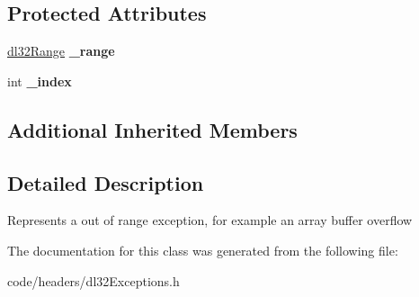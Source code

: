 \subsection*{Protected Attributes}
\begin{DoxyCompactItemize}
\item 
\hypertarget{classdl32_out_of_range_exception_a9b74653965c840ad59e8ba44554a8600}{\hyperlink{structdl32_range}{dl32\-Range} {\bfseries \-\_\-range}}\label{classdl32_out_of_range_exception_a9b74653965c840ad59e8ba44554a8600}

\item 
\hypertarget{classdl32_out_of_range_exception_ac236c9174d9197554aec642efc87e70a}{int {\bfseries \-\_\-index}}\label{classdl32_out_of_range_exception_ac236c9174d9197554aec642efc87e70a}

\end{DoxyCompactItemize}
\subsection*{Additional Inherited Members}


\subsection{Detailed Description}
Represents a out of range exception, for example an array buffer overflow 

The documentation for this class was generated from the following file\-:\begin{DoxyCompactItemize}
\item 
code/headers/dl32\-Exceptions.\-h\end{DoxyCompactItemize}
